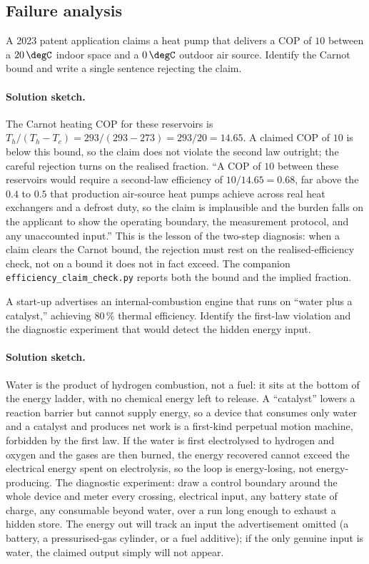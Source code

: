 \subsection*{Failure analysis}

\begin{exercise}
A 2023 patent application claims a heat pump that delivers a COP of
$10$ between a $20\,\degC$ indoor space and a $0\,\degC$ outdoor air
source. Identify the Carnot bound and write a single sentence
rejecting the claim.

\paragraph{Solution sketch.} The Carnot heating COP for these reservoirs
is $T_h/(T_h - T_c) = 293/(293 - 273) = 293/20 = 14.65$. A claimed COP
of $10$ is below this bound, so the claim does not violate the second
law outright; the careful rejection turns on the realised fraction.
``A COP of $10$ between these reservoirs would require a second-law
efficiency of $10/14.65 = 0.68$, far above the $0.4$ to $0.5$ that
production air-source heat pumps achieve across real heat exchangers and
a defrost duty, so the claim is implausible and the burden falls on the
applicant to show the operating boundary, the measurement protocol, and
any unaccounted input.'' This is the lesson of the two-step diagnosis:
when a claim clears the Carnot bound, the rejection must rest on the
realised-efficiency check, not on a bound it does not in fact exceed.
The companion \texttt{efficiency\_claim\_check.py} reports both the bound
and the implied fraction.
\end{exercise}

\begin{exercise}
A start-up advertises an internal-combustion engine that runs on
``water plus a catalyst,'' achieving $80\,\%$ thermal efficiency.
Identify the first-law violation and the diagnostic experiment that
would detect the hidden energy input.

\paragraph{Solution sketch.} Water is the product of hydrogen
combustion, not a fuel: it sits at the bottom of the energy ladder, with
no chemical energy left to release. A ``catalyst'' lowers a reaction
barrier but cannot supply energy, so a device that consumes only water
and a catalyst and produces net work is a first-kind perpetual motion
machine, forbidden by the first law. If the water is first electrolysed
to hydrogen and oxygen and the gases are then burned, the energy
recovered cannot exceed the electrical energy spent on electrolysis, so
the loop is energy-losing, not energy-producing. The diagnostic
experiment: draw a control boundary around the whole device and meter
every crossing, electrical input, any battery state of charge, any
consumable beyond water, over a run long enough to exhaust a hidden
store. The energy out will track an input the advertisement omitted (a
battery, a pressurised-gas cylinder, or a fuel additive); if the only
genuine input is water, the claimed output simply will not appear.
\end{exercise}

